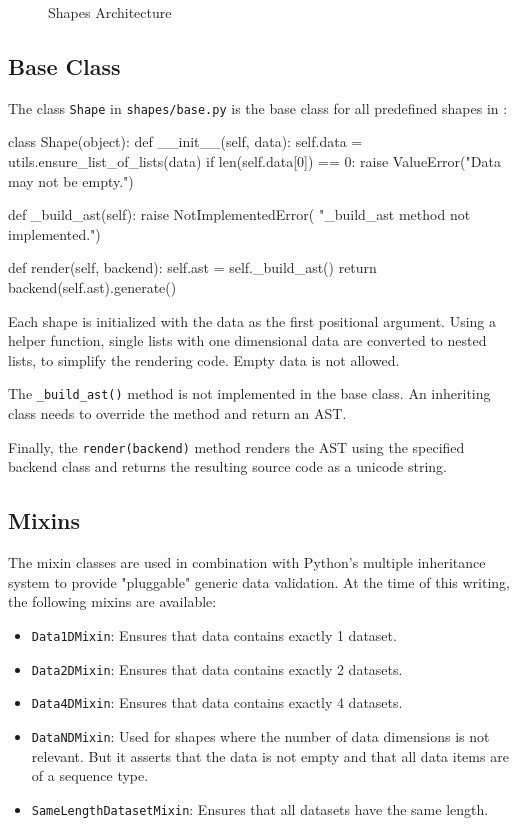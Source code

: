 \begin{figure}[H]
	\centering
	
	\caption{Shapes Architecture}
	\label{img:shapes}
\end{figure}

\subsection{Base Class}

The class \texttt{Shape} in \texttt{shapes/base.py} is the base class for all
predefined shapes in \tangible{}:

\vspace{.5\baselineskip}

\begin{pythoncode}
class Shape(object):
    def __init__(self, data):
        self.data = utils.ensure_list_of_lists(data)
        if len(self.data[0]) == 0:
            raise ValueError("Data may not be empty.")

    def _build_ast(self):
        raise NotImplementedError(
                "_build_ast method not implemented.")

    def render(self, backend):
        self.ast = self._build_ast()
        return backend(self.ast).generate()
\end{pythoncode}

Each shape is initialized with the data as the first positional argument. Using
a helper function, single lists with one dimensional data are converted to
nested lists, to simplify the rendering code. Empty data is not allowed.

The \texttt{\_build\_ast()} method is not implemented in the base class. An
inheriting class needs to override the method and return an AST.

Finally, the \texttt{render(backend)} method renders the AST using the specified
backend class and returns the resulting source code as a unicode string.

\subsection{Mixins}

The mixin classes are used in combination with Python's multiple inheritance
system to provide "pluggable" generic data validation. At the time of this
writing, the following mixins are available:

\begin{itemize}
	\item \texttt{Data1DMixin}: Ensures that data contains exactly 1 dataset.
	\item \texttt{Data2DMixin}: Ensures that data contains exactly 2 datasets.
	\item \texttt{Data4DMixin}: Ensures that data contains exactly 4 datasets.
	\item \texttt{DataNDMixin}: Used for shapes where the number of data
		dimensions is not relevant. But it asserts that the data is not empty and
		that all data items are of a sequence type.
	\item \texttt{SameLengthDatasetMixin}: Ensures that all datasets have the same
		length.
\end{itemize}


